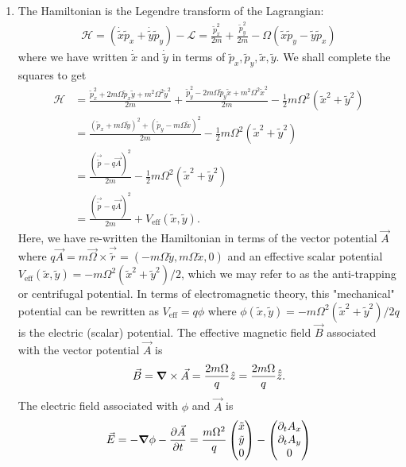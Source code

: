 \documentclass{article}
\theoremstyle{definition}
\newcommand{\p}{\partial}
\newcommand{\lag}{\mathcal{L}}
\newcommand{\ham}{\mathcal{H}}
\newcommand{\f}[2]{\frac{#1}{#2}}
\newcommand{\lp}{\left(}
\newcommand{\rp}{\right)}
\begin{document}
\begin{enumerate}[label=\alph*)]
	\item The Hamiltonian is the Legendre transform of the Lagrangian:
	\begin{align*}
		\ham 
		= \lp \dot{\tilde{x}}\tilde{p}_x + \dot{\tilde{y}}\tilde{p}_y \rp - \lag 
		= \f{\tilde{p}_x^2}{2m} +\f{\tilde{p}_y^2}{2m} - \Omega (\tilde{x}  \tilde{p}_y  -  \tilde{y} \tilde{p}_x)
	\end{align*}
	where we have written $\dot{\tilde{x}}$ and $\dot{\tilde{y}}$ in terms of $\tilde{p}_x,\tilde{p}_y,\tilde{x},\tilde{y}$. We shall complete the squares to get
	\begin{align*}
		\ham 
		&= \f{\tilde{p}_x^2 + 2 m\Omega \tilde{p}_x\tilde{y} + m^2\Omega^2 \tilde{y}^2}{2m} + 
		\f{\tilde{p}_y^2 - 2 m\Omega \tilde{p}_y\tilde{x} + m^2\Omega^2 \tilde{x}^2}{2m} - \f{1}{2}m\Omega^2 (\tilde{x}^2 + \tilde{y}^2) \\ 
		&= \f{(\tilde{p}_x + m\Omega \tilde{y})^2 + (\tilde{p}_y - m\Omega \tilde{x})^2}{2m} - \f{1}{2}m\Omega^2 (\tilde{x}^2 + \tilde{y}^2) \\
		&= \f{(\vec{\tilde{p}} - q\vec{A})^2}{2m}  - \f{1}{2}m\Omega^2 (\tilde{x}^2 + \tilde{y}^2)\\
		&= \f{(\vec{\tilde{p}} - q\vec{A})^2}{2m} + V_\text{eff}(\tilde{x}, \tilde{y}).
	\end{align*}
	Here, we have re-written the Hamiltonian in terms of the vector potential $\vec{A}$ where $q\vec{A} = m \vec{\Omega} \times \vec{\tilde{r}} = (-m\Omega \tilde{y}, m\Omega \tilde{x},0)$ and an effective scalar potential $V_\text{eff}(\tilde{x}, \tilde{y}) = -m\Omega^2 (\tilde{x}^2 + \tilde{y}^2)/2$, which we may refer to as the anti-trapping or centrifugal potential. In terms of electromagnetic theory, this "mechanical" potential can be rewritten as $V_\text{eff}= q \phi$ where $\phi(\tilde{x},\tilde{y}) =  -m\Omega^2 (\tilde{x}^2 + \tilde{y}^2)/2q$ is the electric (scalar) potential. The effective magnetic field $\vec{B}$ associated with the vector potential $\vec{A}$ is 
	\begin{align*}
		\vec{B} = \grad \times \vec{A} = \f{2m\Omega}{q} \hat{z} = \f{2m\Omega}{q} \hat{\tilde{z}}.
	\end{align*}
	The electric field associated with $\phi$ and $\vec{A}$ is 
	\begin{align*}
		\vec{E} =  - \grad \phi - \f{\p \vec{A}}{\p t} = \f{m\Omega^2}{q}\begin{pmatrix}
			\tilde{x} \\ \tilde{y} \\ 0
		\end{pmatrix}
	- \begin{pmatrix}
		\p_t A_x \\ \p_t A_y \\ 0
	\end{pmatrix}
	\end{align*}



\end{enumerate}
\end{document}
